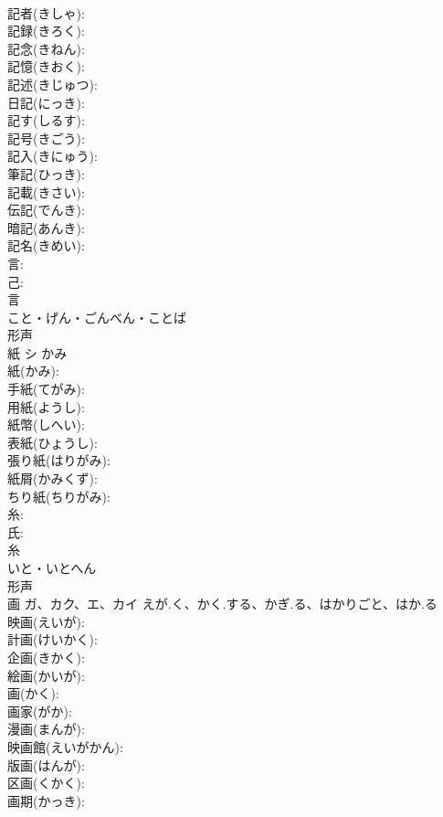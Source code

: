 \documentclass[8pt]{extreport}
\begin{document}
\begin{CJK}{UTF8}{min}
\\	記者(きしゃ): 
\\	記録(きろく): 
\\	記念(きねん): 
\\	記憶(きおく): 
\\	記述(きじゅつ): 
\\	日記(にっき): 
\\	記す(しるす): 
\\	記号(きごう): 
\\	記入(きにゅう): 
\\	筆記(ひっき): 
\\	記載(きさい): 
\\	伝記(でんき): 
\\	暗記(あんき): 
\\	記名(きめい): 
\\	言: 
\\	己: 
\\	言	
\\	こと・げん・ごんべん・ことば	
\\	形声 
\\	紙	シ	かみ		
\\	紙(かみ): 
\\	手紙(てがみ): 
\\	用紙(ようし): 
\\	紙幣(しへい): 
\\	表紙(ひょうし): 
\\	張り紙(はりがみ): 
\\	紙屑(かみくず): 
\\	ちり紙(ちりがみ): 
\\	糸: 
\\	氏: 
\\	糸	
\\	いと・いとへん	
\\	形声 
\\	画	ガ、カク、エ、カイ	えが.く、かく.する、かぎ.る、はかりごと、はか.る		
\\	映画(えいが): 
\\	計画(けいかく): 
\\	企画(きかく): 
\\	絵画(かいが): 
\\	画(かく): 
\\	画家(がか): 
\\	漫画(まんが): 
\\	映画館(えいがかん): 
\\	版画(はんが): 
\\	区画(くかく): 
\\	画期(かっき): 

\end{CJK}
\end{document}
